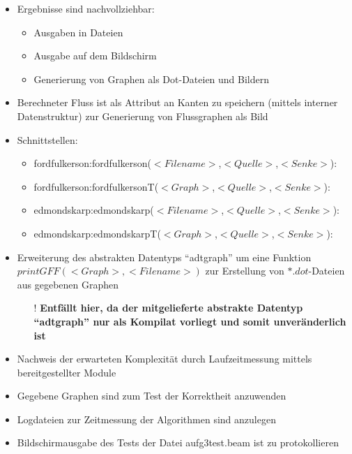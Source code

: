 \documentclass[11pt]{article}
\begin{document}
    \begin{itemize}
        \item Ergebnisse sind nachvollziehbar:
        \begin{itemize}
            \item Ausgaben in Dateien
            \item Ausgabe auf dem Bildschirm
            \item Generierung von Graphen als Dot-Dateien und Bildern
        \end{itemize}
        \item Berechneter Fluss ist als Attribut an Kanten zu speichern (mittels interner Datenstruktur) zur Generierung von Flussgraphen als Bild
        \item Schnittstellen:
        \begin{itemize}
            \item fordfulkerson:fordfulkerson($<Filename>$,$<Quelle>$,$<Senke>$):\\ 
            \item fordfulkerson:fordfulkersonT($<Graph>$,$<Quelle>$,$<Senke>$):\\ 
            \item edmondskarp:edmondskarp($<Filename>$,$<Quelle>$,$<Senke>$):\\ 
            \item edmondskarp:edmondskarpT($<Graph>$,$<Quelle>$,$<Senke>$):\\ 
        \end{itemize}
        \item Erweiterung des abstrakten Datentyps "`adtgraph"' um eine Funktion \newline $printGFF(<Graph>,<Filename>)$ zur Erstellung von $*.dot$-Dateien aus gegebenen Graphen
        \begin{itemize}
            \item[!] \textbf{Entf\"allt hier, da der mitgelieferte abstrakte Datentyp "`adtgraph"' nur als Kompilat vorliegt und somit unver\"anderlich ist}
        \end{itemize}
        \item Nachweis der erwarteten Komplexit\"at durch Laufzeitmessung mittels bereitgestellter Module
        \item Gegebene Graphen sind zum Test der Korrektheit anzuwenden
        \item Logdateien zur Zeitmessung der Algorithmen sind anzulegen
        \item Bildschirmausgabe des Tests der Datei aufg3test.beam ist zu protokollieren
    \end{itemize}
\end{document}
